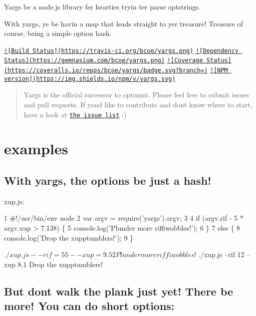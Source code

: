 Yargs be a node.\+js library fer hearties tryin\textquotesingle{} ter parse optstrings.

With yargs, ye be havin\textquotesingle{} a map that leads straight to yer treasure! Treasure of course, being a simple option hash.

\href{https://travis-ci.org/bcoe/yargs}{\tt !\mbox{[}Build Status\mbox{]}(https\+://travis-\/ci.\+org/bcoe/yargs.\+png)} \href{https://gemnasium.com/bcoe/yargs}{\tt !\mbox{[}Dependency Status\mbox{]}(https\+://gemnasium.\+com/bcoe/yargs.\+png)} \href{https://coveralls.io/r/bcoe/yargs?branch=}{\tt !\mbox{[}Coverage Status\mbox{]}(https\+://coveralls.\+io/repos/bcoe/yargs/badge.\+svg?branch=)} \href{https://www.npmjs.com/package/yargs}{\tt !\mbox{[}N\+P\+M version\mbox{]}(https\+://img.\+shields.\+io/npm/v/yargs.\+svg)}

\begin{quote}
Yargs is the official successor to optimist. Please feel free to submit issues and pull requests. If you\textquotesingle{}d like to contribute and don\textquotesingle{}t know where to start, have a look at \href{https://github.com/bcoe/yargs/issues}{\tt the issue list} \+:) \end{quote}


\section*{examples }

\subsection*{With yargs, the options be just a hash! }

xup.\+js\+:


\begin{DoxyCode}
1 #!/usr/bin/env node
2 var argv = require('yargs').argv;
3 
4 if (argv.rif - 5 * argv.xup > 7.138) \{
5     console.log('Plunder more riffiwobbles!');
6 \}
7 else \{
8     console.log('Drop the xupptumblers!');
9 \}
\end{DoxyCode}




 \begin{DoxyVerb}$ ./xup.js --rif=55 --xup=9.52
Plunder more riffiwobbles!

$ ./xup.js --rif 12 --xup 8.1
Drop the xupptumblers!
\end{DoxyVerb}




\subsection*{But don\textquotesingle{}t walk the plank just yet! There be more! You can do short options\+: }

